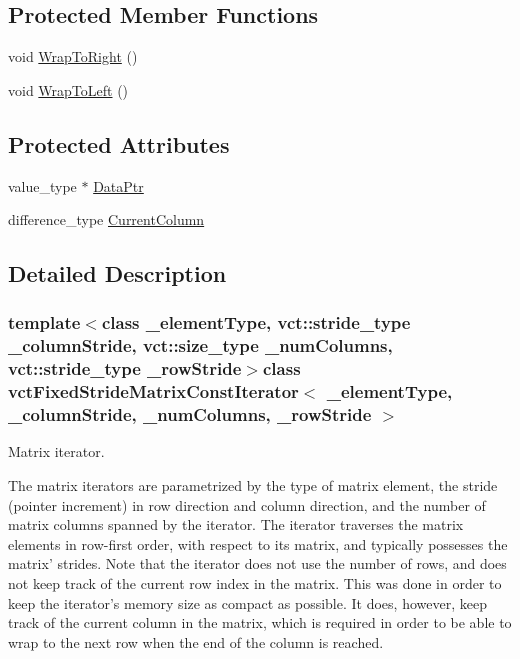 \subsection*{Protected Member Functions}
\begin{DoxyCompactItemize}
\item 
void \hyperlink{classvct_fixed_stride_matrix_const_iterator_afa277bf20aa5dfe2ee106125042a0951}{Wrap\-To\-Right} ()
\item 
void \hyperlink{classvct_fixed_stride_matrix_const_iterator_aefa72290513bc63a442ee12d2fe86f0a}{Wrap\-To\-Left} ()
\end{DoxyCompactItemize}
\subsection*{Protected Attributes}
\begin{DoxyCompactItemize}
\item 
value\-\_\-type $\ast$ \hyperlink{classvct_fixed_stride_matrix_const_iterator_afcb4fd9b3a426eaa6b28e36d741a4b24}{Data\-Ptr}
\item 
difference\-\_\-type \hyperlink{classvct_fixed_stride_matrix_const_iterator_a2e5d93bb3d47edb6e75d294a520f6f32}{Current\-Column}
\end{DoxyCompactItemize}


\subsection{Detailed Description}
\subsubsection*{template$<$class \-\_\-element\-Type, vct\-::stride\-\_\-type \-\_\-column\-Stride, vct\-::size\-\_\-type \-\_\-num\-Columns, vct\-::stride\-\_\-type \-\_\-row\-Stride$>$class vct\-Fixed\-Stride\-Matrix\-Const\-Iterator$<$ \-\_\-element\-Type, \-\_\-column\-Stride, \-\_\-num\-Columns, \-\_\-row\-Stride $>$}

Matrix iterator. 

The matrix iterators are parametrized by the type of matrix element, the stride (pointer increment) in row direction and column direction, and the number of matrix columns spanned by the iterator. The iterator traverses the matrix elements in row-\/first order, with respect to its matrix, and typically possesses the matrix' strides. Note that the iterator does not use the number of rows, and does not keep track of the current row index in the matrix. This was done in order to keep the iterator's memory size as compact as possible. It does, however, keep track of the current column in the matrix, which is required in order to be able to wrap to the next row when the end of the column is reached.


